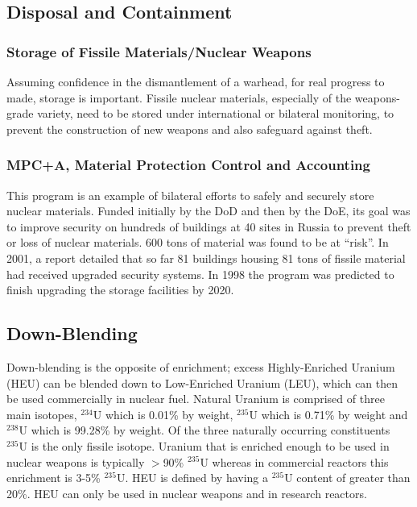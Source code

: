 \documentclass[twoside,titlepage,11pt,twocolumn,a4paper]{article}
\begin{document}
\subsection{Disposal and Containment}
\subsubsection{Storage of Fissile Materials/Nuclear Weapons}
Assuming confidence in the dismantlement of a warhead, for real
progress to made, storage is important. Fissile nuclear materials,
especially of the weapons-grade variety, need to be stored under
international or bilateral monitoring, to prevent the construction of
new weapons and also safeguard against theft.

\subsubsection{MPC+A, Material Protection Control and Accounting}
This program is an example of bilateral efforts to safely and securely
store nuclear materials. Funded initially by the DoD and then by the
DoE, its goal was to improve security on hundreds of buildings at 40
sites in Russia to prevent theft or loss of nuclear materials. 600
tons of material was found to be at ``risk''. In 2001, a report
detailed that so far 81 buildings housing 81 tons of fissile material
had received upgraded security systems. In 1998 the program was
predicted to finish upgrading the storage facilities by
2020. \citep{y12}

\subsection{Down-Blending}
Down-blending is the opposite of enrichment; excess Highly-Enriched
Uranium (HEU) can be blended down to Low-Enriched Uranium (LEU), which
can then be used commercially in nuclear fuel. Natural Uranium is
comprised of three main isotopes, \( \mathrm{^{234}U} \) which is
0.01\% by weight, \( \mathrm{^{235}U} \) which is 0.71\% by weight and
\( \mathrm{^{238}U} \) which is 99.28\% by weight.  Of the three
naturally occurring constituents \( \mathrm{^{235}U} \) is the only
fissile isotope.  Uranium that is enriched enough to be used in
nuclear weapons is typically \(>\)90\% \( \mathrm{^{235}U} \) whereas
in commercial reactors this enrichment is 3-5\% \( \mathrm{^{235}U}
\).  HEU is defined by having a \( \mathrm{^{235}U} \) content of
greater than 20\%. HEU can only be used in nuclear weapons and in
research reactors.
\end{document}
